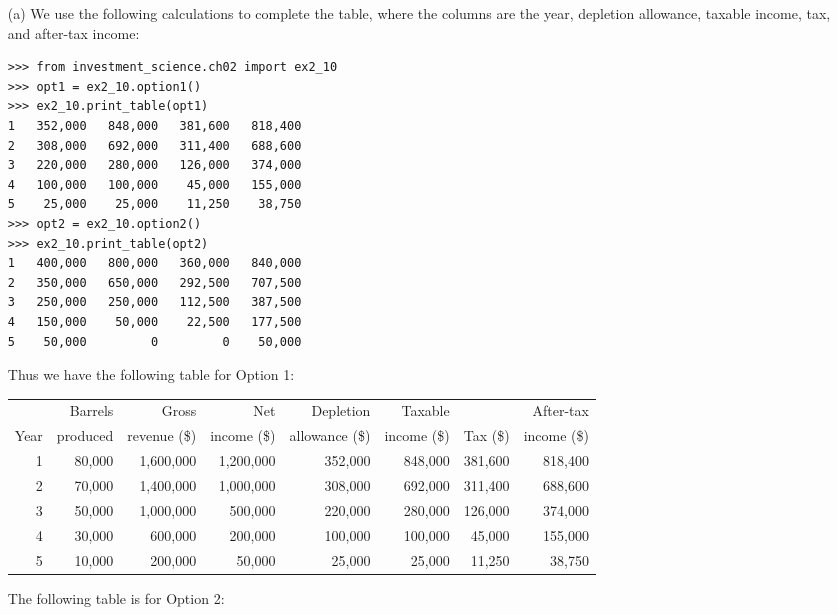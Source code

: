 \begin{itemize}
    \item[(a)] We use the following calculations to complete the table, where
        the columns are the year, depletion allowance, taxable income, tax, and
        after-tax income:
        \begin{lstlisting}
>>> from investment_science.ch02 import ex2_10
>>> opt1 = ex2_10.option1()
>>> ex2_10.print_table(opt1)
1   352,000   848,000   381,600   818,400
2   308,000   692,000   311,400   688,600
3   220,000   280,000   126,000   374,000
4   100,000   100,000    45,000   155,000
5    25,000    25,000    11,250    38,750
>>> opt2 = ex2_10.option2()
>>> ex2_10.print_table(opt2)
1   400,000   800,000   360,000   840,000
2   350,000   650,000   292,500   707,500
3   250,000   250,000   112,500   387,500
4   150,000    50,000    22,500   177,500
5    50,000         0         0    50,000
        \end{lstlisting}
        Thus we have the following table for Option 1:
        \begin{center}
            \begin{adjustbox}{max width=\linewidth}
                \begin{tabular}{r|r|r|r|r|r|r|r}
                    & Barrels & Gross & Net & Depletion & Taxable & & After-tax \\
                    Year & produced & revenue (\$) & income (\$) & allowance (\$) &
                    income (\$) & Tax (\$) & income (\$) \\
                    \hline
                    1 & 80,000 & 1,600,000 & 1,200,000 & 352,000 & 848,000 & 381,600 & 818,400 \\
                    2 & 70,000 & 1,400,000 & 1,000,000 & 308,000 & 692,000 & 311,400 & 688,600 \\
                    3 & 50,000 & 1,000,000 & 500,000 & 220,000 & 280,000 & 126,000 & 374,000 \\
                    4 & 30,000 & 600,000 & 200,000 & 100,000 & 100,000 & 45,000 & 155,000 \\
                    5 & 10,000 & 200,000 & 50,000 & 25,000 & 25,000 & 11,250 & 38,750
                \end{tabular}
            \end{adjustbox}
        \end{center}
        The following table is for Option 2:
        \begin{center}
            \begin{adjustbox}{max width=\linewidth}

\end{adjustbox}
\end{center}
\end{itemize}
